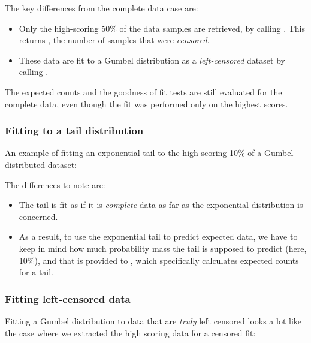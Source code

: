 

The key differences from the complete data case are:

\begin{itemize}
\item Only the high-scoring 50\% of the data samples are
      retrieved, by calling 
      .
      This returns , the number of samples that 
      were \emph{censored}.

\item These data are fit to a Gumbel distribution
      as a \emph{left-censored} dataset by calling
      .
\end{itemize}

The expected counts and the goodness of fit tests are still evaluated
for the complete data, even though the fit was performed only on the
highest scores.


\subsubsection{Fitting to a tail distribution}

An example of fitting an exponential tail to the high-scoring 10\% of
a Gumbel-distributed dataset:



The differences to note are:

\begin{itemize}
\item The tail is fit as if it is \emph{complete} data as far
      as the exponential distribution is concerned.

\item As a result, to use the exponential tail to predict expected
      data, we have to keep in mind how much probability mass the tail
      is supposed to predict (here, 10\%), and that
      is provided to
      , which specifically
      calculates expected counts for a tail.
\end{itemize}

\subsubsection{Fitting left-censored data}

Fitting a Gumbel distribution to data that are \emph{truly} left
censored looks a lot like the case where we extracted the high scoring
data for a censored fit:

